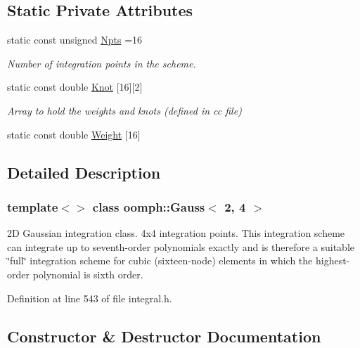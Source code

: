\subsection*{Static Private Attributes}
\begin{DoxyCompactItemize}
\item 
static const unsigned \hyperlink{classoomph_1_1Gauss_3_012_00_014_01_4_adbd25826c5d6062f49392d692584b56b}{Npts} =16
\begin{DoxyCompactList}\small\item\em Number of integration points in the scheme. \end{DoxyCompactList}\item 
static const double \hyperlink{classoomph_1_1Gauss_3_012_00_014_01_4_a3e973f16910cefc76667d47fd2d8e255}{Knot} \mbox{[}16\mbox{]}\mbox{[}2\mbox{]}
\begin{DoxyCompactList}\small\item\em Array to hold the weights and knots (defined in cc file) \end{DoxyCompactList}\item 
static const double \hyperlink{classoomph_1_1Gauss_3_012_00_014_01_4_a1aa1e00414fe956b89da132ebfc30449}{Weight} \mbox{[}16\mbox{]}
\end{DoxyCompactItemize}


\subsection{Detailed Description}
\subsubsection*{template$<$$>$\newline
class oomph\+::\+Gauss$<$ 2, 4 $>$}

2D Gaussian integration class. 4x4 integration points. This integration scheme can integrate up to seventh-\/order polynomials exactly and is therefore a suitable \char`\"{}full\char`\"{} integration scheme for cubic (sixteen-\/node) elements in which the highest-\/order polynomial is sixth order. 

Definition at line 543 of file integral.\+h.



\subsection{Constructor \& Destructor Documentation}
\mbox{\label{classoomph_1_1Gauss_3_012_00_014_01_4_a2f7abdff2bf1665bbf2c237ffd457a97}} 
